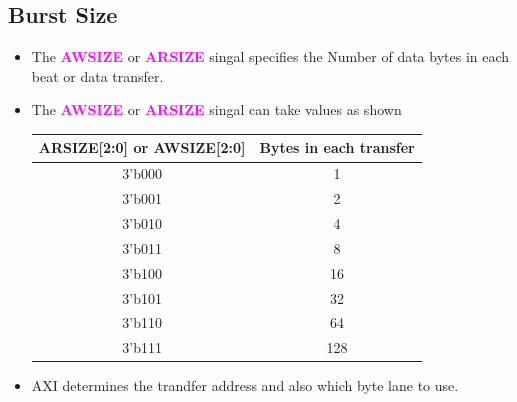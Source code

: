 \documentclass{article}
\newcommand{\AXISignals}[1]{\textbf{\textcolor{magenta}{#1}}}
\begin{document}
\subsection{Burst Size}
\begin{itemize}
    \item The \AXISignals{AWSIZE} or \AXISignals{ARSIZE} singal specifies the Number of data bytes in each beat or data transfer.
    \item The \AXISignals{AWSIZE} or \AXISignals{ARSIZE} singal can take values as shown

          \begin{center}
              \begin{tabular}{c|c}
                  \textbf{ARSIZE[2:0]} or \textbf{AWSIZE[2:0]} & \textbf{Bytes in each transfer} \\
                  \hline
                  3'b000                                       & 1                               \\
                  3'b001                                       & 2                               \\
                  3'b010                                       & 4                               \\
                  3'b011                                       & 8                               \\
                  3'b100                                       & 16                              \\
                  3'b101                                       & 32                              \\
                  3'b110                                       & 64                              \\
                  3'b111                                       & 128                             \\
              \end{tabular}
          \end{center}
    \item AXI determines the trandfer address and also which byte lane to use.
\end{itemize}
\end{document}
